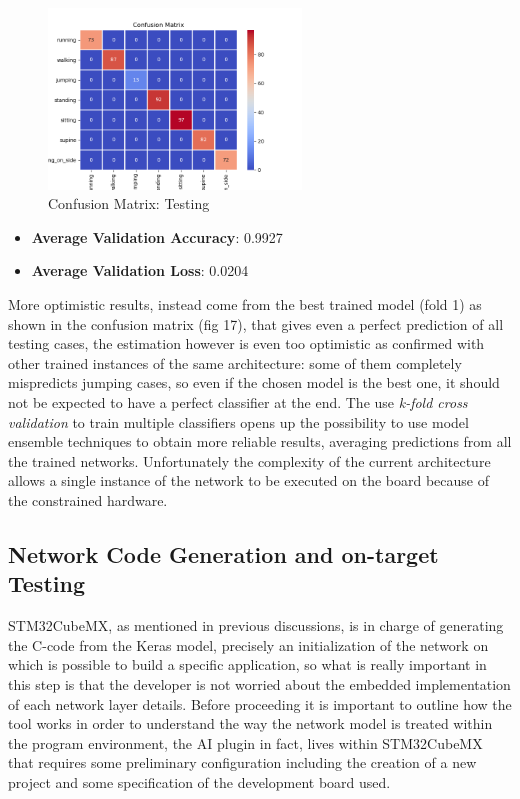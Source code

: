 \begin{figure}
	\hfill\includegraphics[width=0.6\textwidth]{figures/confmat_09-04-2020_221220.png}\hspace*{\fill}
	\caption{Confusion Matrix: Testing}\label{fig:9}
	\centering
	\vspace{-30pt}
\end{figure}
\noindent


\begin{itemize}
	\item \textbf{Average Validation Accuracy}: 0.9927
	\item \textbf{Average Validation Loss}: 0.0204
\end{itemize}
More optimistic results, instead come from the best trained model (fold 1) as shown in the confusion matrix (fig 17), that gives even a perfect prediction of all testing cases, the estimation however is even too optimistic as confirmed with other trained instances of the same architecture: some of them completely mispredicts jumping cases, so even if the chosen model is the best one, it should not be expected to have a perfect classifier at the end. The use \textit{k-fold cross validation} to train multiple classifiers opens up the possibility to use model ensemble techniques to obtain more reliable results, averaging predictions from all the trained networks. Unfortunately the complexity of the current architecture allows a single instance of the network to be executed on the board because of the constrained hardware.

\subsection{Network Code Generation and on-target Testing}
STM32CubeMX, as mentioned in previous discussions, is in charge of generating the C-code from the Keras model, precisely an initialization of the network on which is possible to build a specific application, so what is really important in this step is that the developer is not worried about the embedded implementation of each network layer details.\newline
Before proceeding it is important to outline how the tool works in order to understand the way the network model is treated within the program environment, the AI plugin in fact, lives within STM32CubeMX that requires some preliminary configuration including the creation of a new project and some specification of the development board used.

